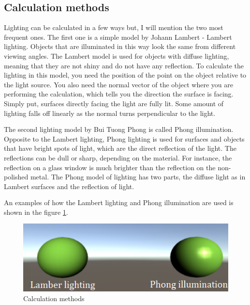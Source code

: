 \documentclass[10pt,twoside,english,a4paper]{article}
\begin{document}
\subsection{Calculation methods} \label{calculation}
Lighting can be calculated in a few ways but, I will mention the two most frequent ones. The first one is a simple model by Johann Lambert - Lambert lighting. Objects that are illuminated in this way look the same from different viewing angles. The Lambert model is used for objects with diffuse lighting, meaning that they are not shiny and do not have any reflection. To calculate the lighting in this model, you need the position of the point on the object relative to the light source. You also need the normal vector of the object where you are performing the calculation, which tells you the direction the surface is facing. Simply put, surfaces directly facing the light are fully lit. Some amount of lighting falls off linearly as the normal turns perpendicular to the light.\cite{Prall}

The second lighting model by Bui Tuong Phong is called Phong illumination. Opposite to the Lambert lighting, Phong lighting is used for surfaces and objects that have bright spots of light, which are the direct reflection of the light. The reflections can be dull or sharp, depending on the material. For instance, the reflection on a glass window is much brighter than the reflection on the non-polished metal. The Phong model of lighting has two parts, the diffuse light as in Lambert surfaces and the reflection of light. \cite{Prall}

An examples of how the Lambert lighting and Phong illumination are used is shown in the figure \ref{fig:pic}.

\begin{figure}[ht]
    \centering
    \includegraphics[scale=1.0]{light_pic.png}
    \caption{Calculation methods\cite{schrute}}
    \label{fig:pic}
\end{figure}
\end{document}
